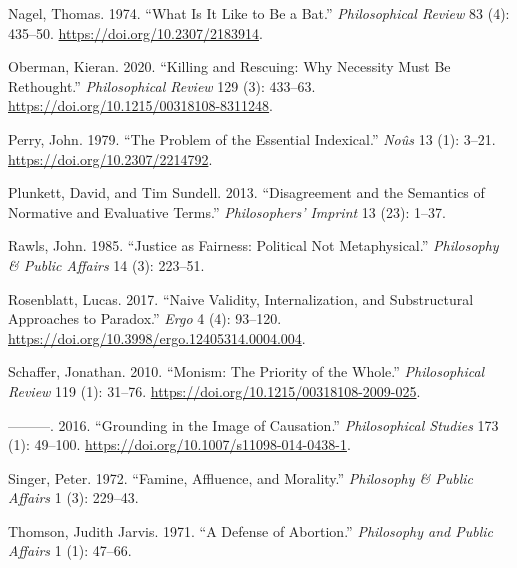\documentclass[
  12pt,
  letterpaper,
  DIV=11,
  numbers=noendperiod]{scrartcl}
\newlength{\cslhangindent}
\newenvironment{CSLReferences}[2] %
 {\begin{list}{}{%
  \setlength{\itemindent}{0pt}
  \setlength{\leftmargin}{0pt}
  \setlength{\parsep}{0pt}
  \ifodd #1
   \setlength{\leftmargin}{\cslhangindent}
   \setlength{\itemindent}{-1\cslhangindent}
  \fi
  \setlength{\itemsep}{#2\baselineskip}}}
 {\end{list}}
\begin{document}
\begin{CSLReferences}{1}{0}
Nagel, Thomas. 1974. {``What Is It Like to Be a Bat.''}
\emph{Philosophical Review} 83 (4): 435--50.
\url{https://doi.org/10.2307/2183914}.

Oberman, Kieran. 2020. {``Killing and Rescuing: Why Necessity Must Be
Rethought.''} \emph{Philosophical Review} 129 (3): 433--63.
\url{https://doi.org/10.1215/00318108-8311248}.

Perry, John. 1979. {``The Problem of the Essential Indexical.''}
\emph{Noûs} 13 (1): 3--21. \url{https://doi.org/10.2307/2214792}.

Plunkett, David, and Tim Sundell. 2013. {``Disagreement and the
Semantics of Normative and Evaluative Terms.''} \emph{Philosophers'
Imprint} 13 (23): 1--37.

Rawls, John. 1985. {``Justice as Fairness: Political Not
Metaphysical.''} \emph{Philosophy \& Public Affairs} 14 (3): 223--51.

Rosenblatt, Lucas. 2017. {``Naive Validity, Internalization, and
Substructural Approaches to Paradox.''} \emph{Ergo} 4 (4): 93--120.
\url{https://doi.org/10.3998/ergo.12405314.0004.004}.

Schaffer, Jonathan. 2010. {``Monism: The Priority of the Whole.''}
\emph{Philosophical Review} 119 (1): 31--76.
\url{https://doi.org/10.1215/00318108-2009-025}.

---------. 2016. {``Grounding in the Image of Causation.''}
\emph{Philosophical Studies} 173 (1): 49--100.
\url{https://doi.org/10.1007/s11098-014-0438-1}.

Singer, Peter. 1972. {``Famine, Affluence, and Morality.''}
\emph{Philosophy \& Public Affairs} 1 (3): 229--43.

Thomson, Judith Jarvis. 1971. {``A Defense of Abortion.''}
\emph{Philosophy and Public Affairs} 1 (1): 47--66.

\end{CSLReferences}
\end{document}
